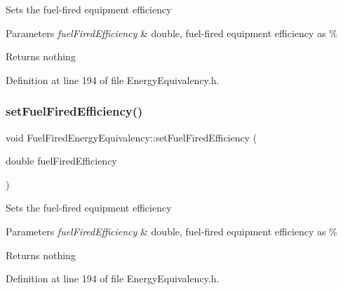 Sets the fuel-\/fired equipment efficiency


\begin{DoxyParams}{Parameters}
{\em fuel\+Fired\+Efficiency} & double, fuel-\/fired equipment efficiency as \%\\
\hline
\end{DoxyParams}
\begin{DoxyReturn}{Returns}
nothing 
\end{DoxyReturn}


Definition at line 194 of file Energy\+Equivalency.\+h.

\mbox{\label{class_fuel_fired_energy_equivalency_a510b4a7c1231faeeebca02fa0b1723ae}} 
\subsubsection{\texorpdfstring{set\+Fuel\+Fired\+Efficiency()}{setFuelFiredEfficiency()}\hspace{0.1cm}{\footnotesize\ttfamily [2/3]}}
{\footnotesize\ttfamily void Fuel\+Fired\+Energy\+Equivalency\+::set\+Fuel\+Fired\+Efficiency (\begin{DoxyParamCaption}\item[{double}]{fuel\+Fired\+Efficiency }\end{DoxyParamCaption})\hspace{0.3cm}{\ttfamily [inline]}}

Sets the fuel-\/fired equipment efficiency


\begin{DoxyParams}{Parameters}
{\em fuel\+Fired\+Efficiency} & double, fuel-\/fired equipment efficiency as \%\\
\hline
\end{DoxyParams}
\begin{DoxyReturn}{Returns}
nothing 
\end{DoxyReturn}


Definition at line 194 of file Energy\+Equivalency.\+h.

\mbox{\label{class_fuel_fired_energy_equivalency_a510b4a7c1231faeeebca02fa0b1723ae}} 
